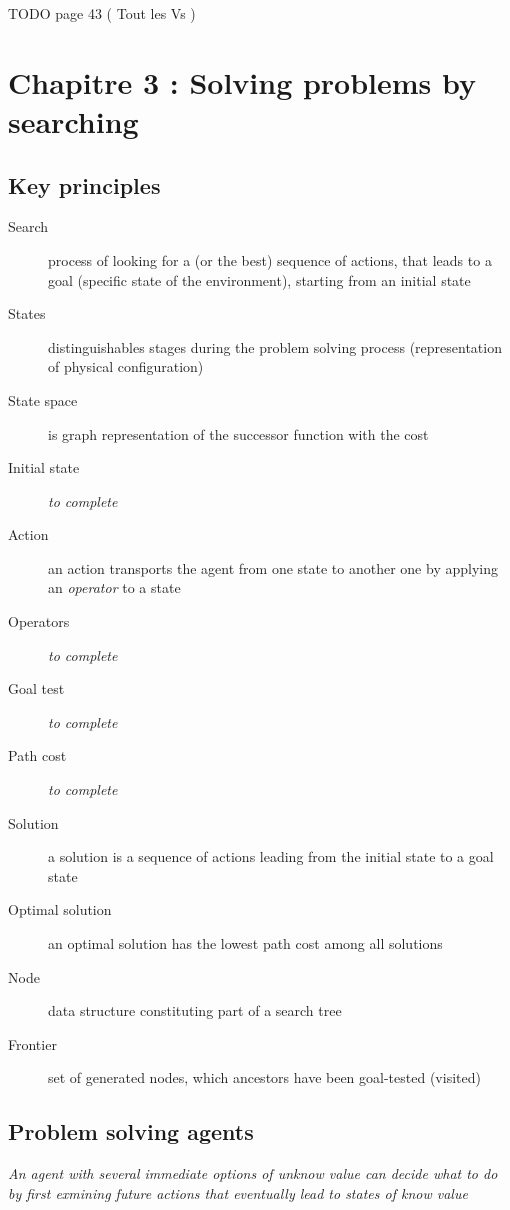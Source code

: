 TODO page 43 ( Tout les Vs )

\section{Chapitre 3 : Solving problems by searching}

\subsection{Key principles}

\begin{description}
    \item[Search] process of looking for a (or the best) sequence of actions, that leads to a goal (specific state of the environment), starting from an initial state
    \item[States] distinguishables stages during the problem solving process (representation of physical configuration)
    \item[State space] is graph representation of the successor function with the cost
    \item[Initial state] \textit{to complete}
    \item[Action] an action transports the agent from one state to another one by applying an \textit{operator} to a state
    \item[Operators] \textit{to complete}
    \item[Goal test] \textit{to complete}
    \item[Path cost] \textit{to complete}
    \item[Solution] a solution is a sequence of actions leading from the initial state to a goal state
    \item[Optimal solution] an optimal solution has the lowest path cost among all solutions
    \item[Node] data structure constituting part of a search tree
    \item[Frontier] set of generated nodes, which ancestors have been goal-tested (visited)
\end{description}

\subsection{Problem solving agents}

\textit{An  agent with  several immediate  options of  unknow value  can
decide what to do by first  exmining future actions that eventually lead
to states of know value}

